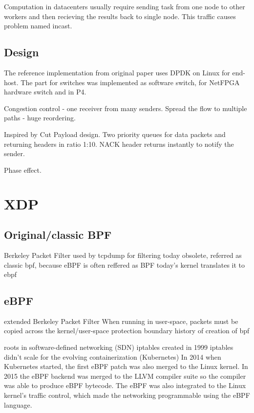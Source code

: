 Computation in datacenters usually require sending task from one node to other workers and then recieving the results back to single node. This traffic causes problem named incast.


\section{Design}
The reference implementation from original paper uses DPDK on Linux for end-host.
The part for switches was implemented as software switch, for NetFPGA hardware switch and in P4.

Congestion control - one receiver from many senders.
Spread the flow to multiple paths - huge reordering.

Inspired by Cut Payload design.
Two priority queues for data packets and returning headers in ratio 1:10.
NACK header returns instantly to notify the sender.

Phase effect.



\chapter{XDP}

\section{Original/classic BPF}
Berkeley Packet Filter
used by tcpdump for filtering
today obsolete, referred as classic bpf, because eBPF is often reffered as BPF
today's kernel translates it to ebpf


\section{eBPF}
extended Berkeley Packet Filter
When running in user-space, packets must be copied across the kernel/user-space protection boundary
history of creation of bpf

roots in software-defined networking (SDN)
iptables created in 1999
iptables didn't scale for the evolving containerization (Kubernetes)
In 2014 when Kubernetes started, the first eBPF patch was also merged to the Linux kernel.
In 2015 the eBPF backend was merged to the LLVM compiler suite so the compiler was able to produce eBPF bytecode.
The eBPF was also integrated to the Linux kernel's traffic control, which made the networking programmable using the eBPF language.

